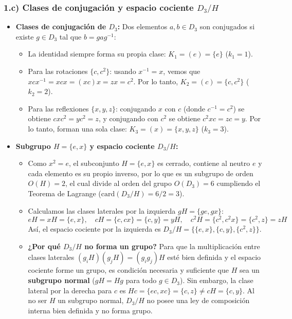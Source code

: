 \documentclass[11pt, a4paper]{article}
\begin{document}
\subsubsection*{1.c) Clases de conjugación y espacio cociente $D_3/H$}
\begin{itemize}
    \item \textbf{Clases de conjugación de $D_3$:} Dos elementos $a, b \in D_3$ son conjugados si existe $g \in D_3$ tal que $b = gag^{-1}$:
    \begin{itemize}
        \item La identidad siempre forma su propia clase: $K_1 = (e) = \{e\}$ ($k_1 = 1$).
        \item Para las rotaciones $\{c, c^2\}$: usando $x^{-1} = x$, vemos que $xcx^{-1} = xcx = (xc)x = zx = c^2$. Por lo tanto, $K_2 = (c) = \{c, c^2\}$ ($k_2 = 2$).
        \item Para las reflexiones $\{x, y, z\}$: conjugando $x$ con $c$ (donde $c^{-1} = c^2$) se obtiene $cxc^2 = yc^2 = z$, y conjugando con $c^2$ se obtiene $c^2xc = zc = y$. Por lo tanto, forman una sola clase: $K_3 = (x) = \{x, y, z\}$ ($k_3 = 3$).
    \end{itemize}
    \item \textbf{Subgrupo $H = \{e, x\}$ y espacio cociente $D_3/H$:}
    \begin{itemize}
        \item Como $x^2 = e$, el subconjunto $H = \{e, x\}$ es cerrado, contiene al neutro $e$ y cada elemento es su propio inverso, por lo que es un subgrupo de orden $O(H) = 2$, el cual divide al orden del grupo $O(D_3) = 6$ cumpliendo el Teorema de Lagrange ($\text{card}(D_3/H) = 6/2 = 3$).
        \item Calculamos las clases laterales por la izquierda $gH = \{ge, gx\}$:
        \[
        eH = xH = \{e, x\}, \quad cH = \{c, cx\} = \{c, y\} = yH, \quad c^2H = \{c^2, c^2x\} = \{c^2, z\} = zH
        \]
        Así, el espacio cociente por la izquierda es $D_3/H = \{\{e, x\}, \{c, y\}, \{c^2, z\}\}$.
        \item \textbf{¿Por qué $D_3/H$ no forma un grupo?} Para que la multiplicación entre clases laterales $(g_i H)(g_j H) = (g_i g_j)H$ esté bien definida y el espacio cociente forme un grupo, es condición necesaria y suficiente que $H$ sea un \textbf{subgrupo normal} ($gH = Hg$ para todo $g \in D_3$). Sin embargo, la clase lateral por la derecha para $c$ es $Hc = \{ec, xc\} = \{c, z\} \neq cH = \{c, y\}$. Al no ser $H$ un subgrupo normal, $D_3/H$ no posee una ley de composición interna bien definida y no forma grupo.
    \end{itemize}
\end{itemize}
\end{document}
